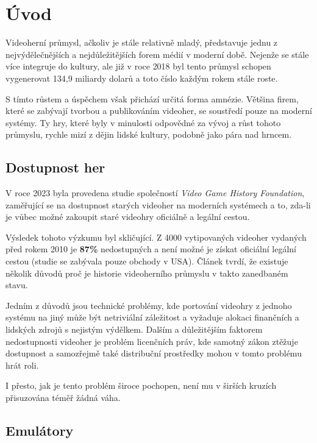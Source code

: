 \chapter{Úvod}
\label{introduction}

Videoherní průmysl, ačkoliv je stále relativně mladý, představuje
jednu z nejvýdělečnějších a nejdůležitějších forem médií v moderní době.
Nejenže se stále více integruje do kultury, ale již v roce 2018 byl
tento průmysl schopen vygenerovat 134,9 miliardy dolarů \cite{VideoGameProfit} a toto číslo každým rokem stále roste.

S tímto růstem a úspěchem však přichází určitá forma amnézie. 
Většina firem, které se zabývají tvorbou a publikováním videoher, se soustředí pouze na moderní systémy. 
Ty hry, které byly v minulosti odpovědné za vývoj a růst tohoto průmyslu, rychle mizí z dějin lidské kultury, podobně jako pára nad hrncem.

\section{Dostupnost her}

V roce 2023 byla provedena studie \cite{VideoGameSurvery} společností \textit{Video Game History Foundation}, 
zaměřující se na dostupnost starých videoher na moderních systémech 
a to, zda-li je vůbec možné zakoupit staré videohry oficiálně a legální cestou.

Výsledek tohoto výzkumu byl skličující. 
Z 4000 vytipovaných videoher vydaných před rokem 2010 je \textbf{87\%} nedostupných  \cite{VideoGameSurvery} 
a není možné je získat oficiální legální cestou (studie se zabývala pouze obchody v USA). 
Článek tvrdí, že existuje několik důvodů proč je historie videoherního průmyslu v takto zanedbaném stavu.

Jedním z důvodů jsou technické problémy, 
kde portování videohry z jednoho systému na jiný může být netriviální záležitost 
a vyžaduje alokaci finančních a lidských zdrojů s nejistým výdělkem. Dalším a důležitějším faktorem nedostupnosti 
videoher je problém licenčních práv, kde samotný zákon ztěžuje dostupnost 
a samozřejmě také distribuční prostředky mohou v tomto problému hrát roli.

I přesto, jak je tento problém široce pochopen, není mu v širších kruzích přisuzována téměř žádná váha.

\section{Emulátory}

